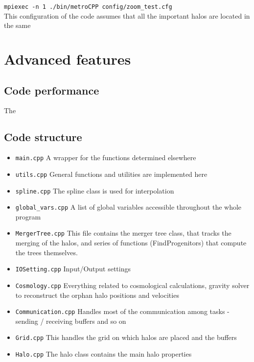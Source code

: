 \documentclass{article}
\begin{document}
\texttt{mpiexec -n 1 ./bin/metroCPP config/zoom\_test.cfg}\\

This configuration of the code assumes that all the important halos are located in the same 

\section{Advanced features}

\subsection{Code performance}

\label{sec:advanced}

The 


\subsection{Code structure}

\begin{itemize}
\item{\texttt{main.cpp}} A wrapper for the functions determined elsewhere
\item{\texttt{utils.cpp}} General functions and utilities are implemented here
\item{\texttt{spline.cpp}} The spline class is used for interpolation 
\item{\texttt{global\_vars.cpp}} A list of global variables accessible throughout the whole program
\item{\texttt{MergerTree.cpp}} This file contains the merger tree class, that tracks the merging of the halos, 
and series of functions (FindProgenitors) that compute the trees themselves.
\item{\texttt{IOSetting.cpp}} Input/Output settings
\item{\texttt{Cosmology.cpp}} Everything related to cosmological calculations, gravity solver to reconstruct the orphan halo 
positions and velocities 
\item{\texttt{Communication.cpp}} Handles most of the communication among tasks - sending / receiving buffers and so on
\item{\texttt{Grid.cpp}} This handles the grid on which halos are placed and the buffers
\item{\texttt{Halo.cpp}} The halo class contains the main halo properties
\end{itemize}
\end{document}

